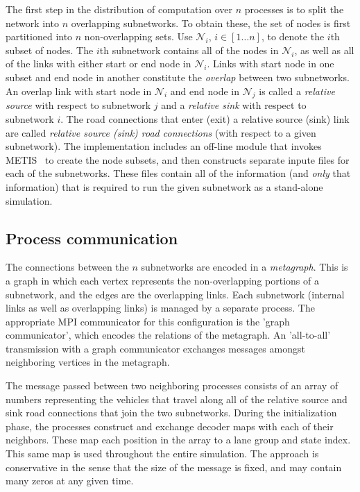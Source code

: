The first step in the distribution of computation over $n$ processes is to split the network into $n$ overlapping subnetworks. To obtain these, the set of nodes is first partitioned into $n$ non-overlapping sets. Use $\mathcal{N}_i$, $i\in[1\hdots n]$, to denote the $i$th subset of nodes. The $i$th subnetwork contains all of the nodes in $\mathcal{N}_i$, as well as all of the links with either start or end node in $\mathcal{N}_i$. 
Links with start node in one subset and end node in another constitute the \textit{overlap} between two subnetworks. An overlap link with start node in $\mathcal{N}_i$ and end node in $\mathcal{N}_j$ is called a \textit{relative source} with respect to subnetwork $j$ and a \textit{relative sink} with respect to subnetwork $i$. The road connections that enter (exit) a relative source (sink) link are called \textit{relative source (sink) road connections} (with respect to a given subnetwork). The implementation includes an off-line module that invokes
METIS~\cite{kaku:98a} to create the node subsets, and then constructs separate inpute files for each of the subnetworks. These files contain all of the information (and \textit{only} that information) that is required to run the given subnetwork as a stand-alone simulation. 

\subsection{Process communication}

The connections between the $n$ subnetworks are encoded in a \textit{metagraph}. This is a graph in which each vertex represents the non-overlapping portions of a subnetwork, and the edges are the overlapping links. Each subnetwork (internal links as well as overlapping links) is managed by a separate process. The appropriate MPI communicator for this configuration is the 'graph communicator', which encodes the relations of the metagraph. An 'all-to-all' transmission with a graph communicator exchanges messages amongst neighboring vertices in the metagraph. 

The message passed between two neighboring processes consists of an array of numbers representing the vehicles that travel along all of the relative source and sink road connections that join the two subnetworks. During the initialization phase, the processes construct and exchange decoder maps with each of their neighbors. These map each position in the array to a lane group and state index. This same map is used throughout the entire simulation. The approach is conservative in the sense that the size of the message is fixed, and may contain many zeros at any given time. 


